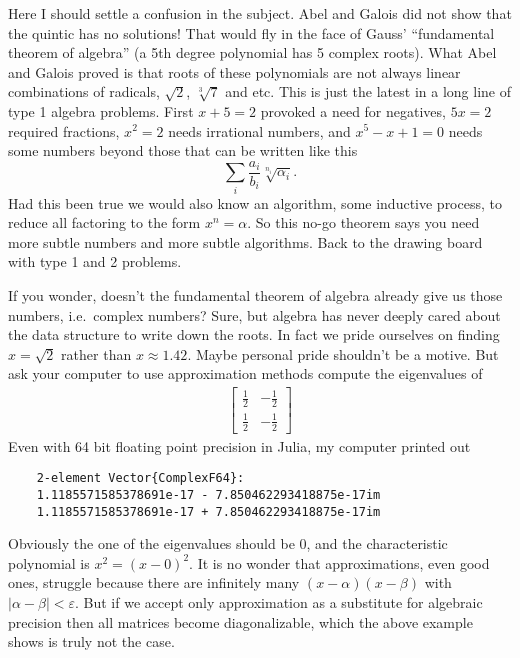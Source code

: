 Here I should settle a confusion in the subject.  Abel and Galois did 
not show that the quintic has no solutions!  That would fly in the 
face of  Gauss' ``fundamental theorem 
of algebra'' (a 5th degree polynomial has 5 complex roots).  
What Abel and Galois proved is that roots of these polynomials 
are not always linear combinations of radicals, $\sqrt{2}$, $\sqrt[3]{7}$ and 
etc.  This is just the latest in a long line of type 1 algebra problems.  First 
$x+5=2$ provoked a need for negatives, $5x=2$ required fractions, $x^2=2$ 
needs irrational numbers, and $x^5-x+1=0$ needs some numbers beyond 
those that can be written like this
\[
    \sum_i \frac{a_i}{b_i}\sqrt[n_i]{\alpha_i}.
\]
Had this been true we would also know an algorithm, some inductive process, 
to reduce all factoring to the form $x^n=\alpha$.  So this no-go theorem 
says you need more subtle numbers and more subtle algorithms. Back to the 
drawing board with type 1 and 2 problems.

If you wonder, doesn't the fundamental theorem of algebra already 
give us those numbers, i.e.\ complex numbers?  Sure, but algebra has never 
deeply cared about the data structure to write down the roots.  In fact we 
pride ourselves on finding $x=\sqrt{2}$ rather than $x\approx 1.42$.
Maybe personal pride shouldn't be a motive.  But ask your computer to 
use approximation methods 
compute the eigenvalues of 
\begin{align*}
    \begin{bmatrix}
        \frac{1}{2} & -\frac{1}{2} \\
        \frac{1}{2} & -\frac{1}{2}
    \end{bmatrix}
\end{align*}
Even with 64 bit floating point precision in Julia, my computer printed out 
\begin{lstlisting}
    2-element Vector{ComplexF64}:
    1.1185571585378691e-17 - 7.850462293418875e-17im
    1.1185571585378691e-17 + 7.850462293418875e-17im       
\end{lstlisting}
Obviously the one of the eigenvalues should be $0$, and the characteristic 
polynomial is $x^2=(x-0)^2$.  It is no wonder that approximations, even good ones,
struggle because there are infinitely many $(x-\alpha)(x-\beta)$ with $|\alpha-\beta|<\varepsilon$.
But if we accept only approximation as a substitute for algebraic precision then 
all matrices become diagonalizable, which the above example shows is truly not the case.





